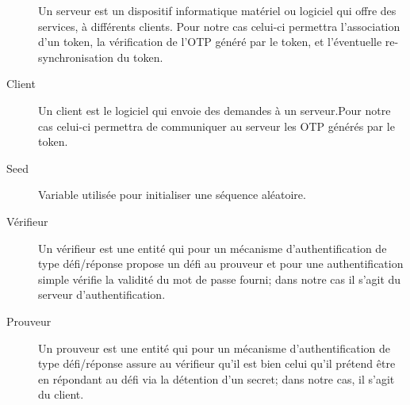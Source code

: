 \documentclass{"../../res/univ-projet"}
\begin{document}
\begin{description}
  	Un serveur est un dispositif informatique mat\'{e}riel ou logiciel qui offre 
  	des services, à diff\'{e}rents clients. Pour notre cas celui-ci permettra 
  	l'association d'un token, la v\'{e}rification de l'OTP g\'{e}n\'{e}r\'{e} par 
  	le token, et l'\'{e}ventuelle re-synchronisation du token.
 	\\ 
	\item[Client]
  	Un client est le logiciel qui envoie des demandes à un serveur.Pour notre 
  	cas celui-ci permettra de communiquer au serveur les OTP g\'{e}n\'{e}r\'{e}s 
  	par le token.
   	\\ 
    \item[Seed] Variable utilis\'ee pour initialiser une s\'equence al\'eatoire.
    \\
    \item[Vérifieur] Un vérifieur est une entité qui pour un mécanisme 
    d'authentification de type défi/réponse propose un défi au prouveur et pour une authentification simple v\'erifie la validité du mot de passe fourni; dans notre
    cas il s'agit du serveur d'authentification.
    \\
    \item[Prouveur] Un prouveur est une entité qui pour un mécanisme 
    d'authentification de type défi/réponse assure au vérifieur qu'il est bien celui qu'il
    prétend être en répondant au défi via la détention d'un secret; dans notre cas,
    il s'agit du client.
\end{description}

\end{document}
